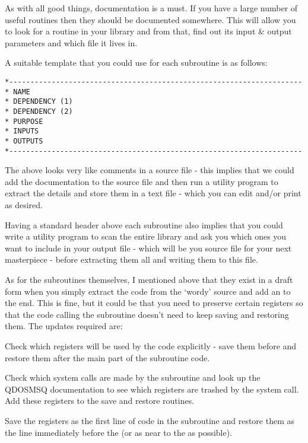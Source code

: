 As with all good things, documentation is a must. If you have a
    large number of useful routines then they should be documented somewhere.
    This will allow you to look for a routine in your library and from that,
    find out its input \& output parameters and which file it lives
    in.

A suitable template that you could use for each subroutine is as
    follows:

\begin{lstlisting}[firstnumber=1,frame=none,numbers=none]
*---------------------------------------------------------------------
* NAME
* DEPENDENCY (1)
* DEPENDENCY (2)
* PURPOSE
* INPUTS
* OUTPUTS
*---------------------------------------------------------------------
\end{lstlisting}

The above looks very like comments in a source file -{} this implies
    that we could add the documentation to the source file and then run a
    utility program to extract the details and store them in a text file -{}
    which you can edit and/or print as desired.

Having a standard header above each subroutine also implies that you
    could write a utility program to scan the entire library and ask you which
    ones you want to include in your output file -{} which will be you source
    file for your next masterpiece -{} before extracting them all and writing
    them to this file.

As for the subroutines themselves, I mentioned above that they exist
    in a draft form when you simply extract the code from the `wordy' source
    and add an  to the end. This is fine, but it could be that you need to
    preserve certain registers so that the code calling the subroutine doesn't
    need to keep saving and restoring them. The updates required are:

Check which registers will be used by the code explicitly -{} save
    them before and restore them after the main part of the subroutine
    code.

Check which system calls are made by the subroutine and look up the
    QDOSMSQ documentation to see which registers are trashed by the system
    call. Add these registers to the save and restore routines.

Save the registers as the first line of code in the subroutine and
    restore them as the line immediately before the  (or as near to the  as possible).

